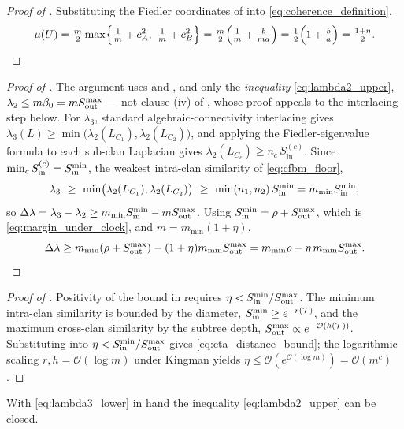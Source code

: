 \begin{proof}[Proof of ]
Substituting the Fiedler coordinates of  into
\eqref{eq:coherence_definition},
\[
   \coh=\tfrac m2\max\Bigl\{\tfrac1m+c_A^2,\ \tfrac1m+c_B^2\Bigr\}
       =\tfrac m2\Bigl(\tfrac1m+\tfrac{b}{ma}\Bigr)
       =\tfrac12\Bigl(1+\tfrac ba\Bigr)=\tfrac{1+\eta}{2}. \qedhere
\]
\end{proof}

\begin{proof}[Proof of ]
The argument uses  and , and only the
\emph{inequality} \eqref{eq:lambda2_upper}, $\lambda_2\le m\beta_0=mS_{\mathrm{out}}^{\max}$ ---
not clause (iv) of , whose proof appeals to the interlacing step
below.
For $\lambda_3$, standard algebraic-connectivity interlacing gives
$\lambda_3(L)\ge\min\bigl(\lambda_2(L_{C_1}),\lambda_2(L_{C_2})\bigr)$, and applying
the Fiedler-eigenvalue formula to each sub-clan Laplacian gives
$\lambda_2(L_{C_c})\ge n_c\,S_{\mathrm{in}}^{(c)}$. Since
$\min_c S_{\mathrm{in}}^{(c)}=S_{\mathrm{in}}^{\min}$, the weakest intra-clan similarity of
\eqref{eq:cfbm_floor},
\begin{equation}\label{eq:lambda3_lower}
   \lambda_3\ \ge\ \min\bigl(\lambda_2(L_{C_1}),\lambda_2(L_{C_2})\bigr)
   \ \ge\ \min(n_1,n_2)\,S_{\mathrm{in}}^{\min}=m_{\min}S_{\mathrm{in}}^{\min},
\end{equation}
so $\Delta\lambda=\lambda_3-\lambda_2\ge m_{\min}S_{\mathrm{in}}^{\min}-mS_{\mathrm{out}}^{\max}$. Using
$S_{\mathrm{in}}^{\min}=\rho+S_{\mathrm{out}}^{\max}$, which is \eqref{eq:margin_under_clock}, and
$m=m_{\min}(1+\eta)$,
\[
   \Delta\lambda\ge m_{\min}(\rho+S_{\mathrm{out}}^{\max})-(1+\eta)m_{\min}S_{\mathrm{out}}^{\max}
        =m_{\min}\rho-\eta\,m_{\min}S_{\mathrm{out}}^{\max}. \qedhere
\]
\end{proof}


\begin{proof}[Proof of ]
Positivity of the bound in  requires
$\eta<S_{\mathrm{in}}^{\min}/S_{\mathrm{out}}^{\max}$. The minimum intra-clan similarity is bounded by
the diameter, $S_{\mathrm{in}}^{\min}\ge e^{-r(\mathcal T)}$, and the maximum cross-clan
similarity by the subtree depth, $S_{\mathrm{out}}^{\max}\propto e^{-\mathcal O(h(\mathcal T))}$.
Substituting into $\eta<S_{\mathrm{in}}^{\min}/S_{\mathrm{out}}^{\max}$ gives \eqref{eq:eta_distance_bound};
the logarithmic scaling $r,h=\mathcal O(\log m)$ under Kingman yields
$\eta\le\mathcal O(e^{\mathcal O(\log m)})=\mathcal O(m^c)$.
\end{proof}

\noindent With \eqref{eq:lambda3_lower} in hand the inequality
\eqref{eq:lambda2_upper} can be closed.

